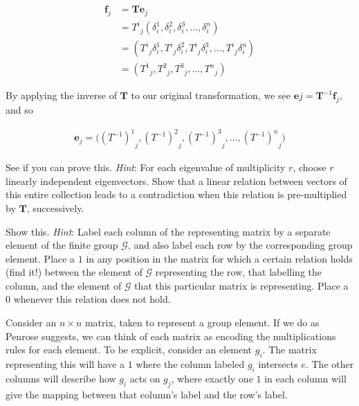 \documentclass[../the-road-to-reality.tex]{subfiles}
\begin{document}
\begin{questions}
\begin{solution}
        \begin{align*}
                \mathbf{f}_j &= \mathbf{Te}_j \\
                &= {T^i}_j(\delta^1_i, \delta^2_i, \delta^3_i, \dots, \delta^n_i) \\
                &= ({T^i}_j\delta^1_i, {T^i}_j\delta^2_i, {T^i}_j\delta^3_i, \dots, {T^i}_j\delta^n_i) \\
                &= ({T^1}_j, {T^2}_j, {T^3}_j, \dots, {T^n}_j)
        \end{align*}

        By applying the inverse of $\mathbf{T}$ to our original transformation, we see $\mathbf{e}j = \mathbf{T}^{-1}\mathbf{f}_j$, and so

        \begin{align*}
                \mathbf{e}_j = \big({(T^{-1})^1}_j, {(T^{-1})^2}_j, {(T^{-1})^3}_j, \dots, {(T^{-1})^n}_j\big)
        \end{align*}
\end{solution}

\question See if you can prove this. \textit{Hint}: For each eigenvalue of multiplicity $r$, choose $r$ linearly independent eigenvectors. Show that a linear relation between vectors of this entire collection leads to a contradiction when this relation is pre-multiplied by $\mathbf{T}$, successively.

\question Show this. \textit{Hint}: Label each column of the representing matrix by a separate element of the finite group $\mathcal{G}$, and also label each row by the corresponding group element. Place a $1$ in any position in the matrix for which a certain relation holds (find it!) between the element of $\mathcal{G}$ representing the row, that labelling the column, and the element of $\mathcal{G}$ that this particular matrix is representing. Place a $0$ whenever this relation does not hold.

\begin{solution}
        Consider an $n\times{n}$ matrix, taken to represent a group element. If we do as Penrose suggests, we can think of each matrix as encoding the multiplications rules for each element. To be explicit, consider an element $g_i$. The matrix representing this will have a $1$ where the column labeled $g_i$ intersects $e$. The other columns will describe how $g_i$ acts on $g_j$, where exactly one $1$ in each column will give the mapping between that column's label and the row's label.
\end{solution}


\end{questions}
\end{document}
